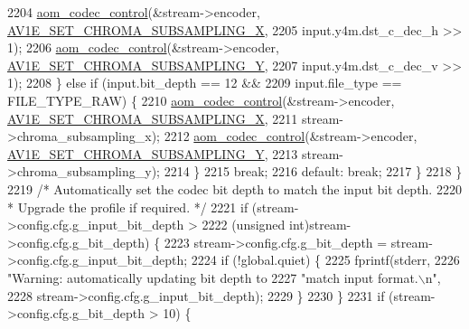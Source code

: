 \begin{DoxyCodeInclude}
{{{{{{{{{{{{{{{{{{{{{{{{{{{{{{{{{{{{{{{{{{{{{{{{{{{2204               \hyperlink{group__codec_ga6da974f4eeaba1fa74106b28d0fe6ac5}{aom\_codec\_control}(&stream->encoder, 
      \hyperlink{group__aom__encoder_ggae78dde67a6d78f332e9bdba0dde42db5a283dd3f4387e5f3a754fea0d206b1cb0}{AV1E\_SET\_CHROMA\_SUBSAMPLING\_X},
2205                                 input.y4m.dst\_c\_dec\_h >> 1);
2206               \hyperlink{group__codec_ga6da974f4eeaba1fa74106b28d0fe6ac5}{aom\_codec\_control}(&stream->encoder, 
      \hyperlink{group__aom__encoder_ggae78dde67a6d78f332e9bdba0dde42db5a501a9453d5790f32c001e9877d3db40c}{AV1E\_SET\_CHROMA\_SUBSAMPLING\_Y},
2207                                 input.y4m.dst\_c\_dec\_v >> 1);
2208             \} \textcolor{keywordflow}{else} \textcolor{keywordflow}{if} (input.bit\_depth == 12 &&
2209                        input.file\_type == FILE\_TYPE\_RAW) \{
2210               \hyperlink{group__codec_ga6da974f4eeaba1fa74106b28d0fe6ac5}{aom\_codec\_control}(&stream->encoder, 
      \hyperlink{group__aom__encoder_ggae78dde67a6d78f332e9bdba0dde42db5a283dd3f4387e5f3a754fea0d206b1cb0}{AV1E\_SET\_CHROMA\_SUBSAMPLING\_X},
2211                                 stream->chroma\_subsampling\_x);
2212               \hyperlink{group__codec_ga6da974f4eeaba1fa74106b28d0fe6ac5}{aom\_codec\_control}(&stream->encoder, 
      \hyperlink{group__aom__encoder_ggae78dde67a6d78f332e9bdba0dde42db5a501a9453d5790f32c001e9877d3db40c}{AV1E\_SET\_CHROMA\_SUBSAMPLING\_Y},
2213                                 stream->chroma\_subsampling\_y);
2214             \}
2215             \textcolor{keywordflow}{break};
2216           \textcolor{keywordflow}{default}: \textcolor{keywordflow}{break};
2217         \}
2218       \}
2219       \textcolor{comment}{/* Automatically set the codec bit depth to match the input bit depth.}
2220 \textcolor{comment}{       * Upgrade the profile if required. */}
2221       \textcolor{keywordflow}{if} (stream->config.cfg.g\_input\_bit\_depth >
2222           (\textcolor{keywordtype}{unsigned} \textcolor{keywordtype}{int})stream->config.cfg.g\_bit\_depth) \{
2223         stream->config.cfg.g\_bit\_depth = stream->config.cfg.g\_input\_bit\_depth;
2224         \textcolor{keywordflow}{if} (!global.quiet) \{
2225           fprintf(stderr,
2226                   \textcolor{stringliteral}{"Warning: automatically updating bit depth to %
2227                   \textcolor{stringliteral}{"match input format.\(\backslash\)n"},
2228                   stream->config.cfg.g\_input\_bit\_depth);
2229         \}
2230       \}
2231       \textcolor{keywordflow}{if} (stream->config.cfg.g\_bit\_depth > 10) \{
}}}}}}}}}}}}}}}}}}}}}}}}}}}}}}}}}}}}}}}}}}}}}}}}}}}}
\end{DoxyCodeInclude}
